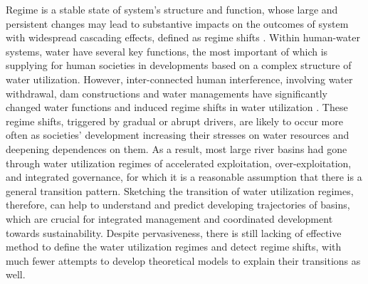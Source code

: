\documentclass[9pt, twocolumn, twoside, lineno]{pnas-new}
\begin{document}
Regime is a stable state of system’s structure and function, whose large and persistent changes may lead to substantive impacts on the outcomes of system with widespread cascading effects, defined as regime shifts \cite{rochaCascadingRegimeShifts2018, schefferCatastrophicRegimeShifts2003, schefferCatastrophicShiftsEcosystems2001}.
Within human-water systems, water have several key functions, the most important of which is supplying for human societies in developments based on a complex structure of water utilization. 
However, inter-connected human interference, involving water withdrawal, dam constructions and water managements have significantly changed water functions and induced regime shifts in water utilization
\cite{falkenmarkUnderstandingWaterResilience2019}.
These regime shifts, triggered by gradual or abrupt drivers, are likely to occur more often as societies' development increasing their stresses on water resources and deepening dependences on them.
As a result, most large river basins had gone through water utilization regimes of accelerated exploitation, over-exploitation, and integrated governance, for which it is a reasonable assumption that there is a general transition pattern. 
Sketching the transition of water utilization regimes, therefore, can help to understand and predict developing trajectories of basins, which are crucial for integrated management and coordinated development towards sustainability.
Despite pervasiveness, there is still lacking of effective method to define the water utilization regimes and detect regime shifts, with much fewer attempts to develop theoretical models to explain their transitions as well. 
\end{document}
